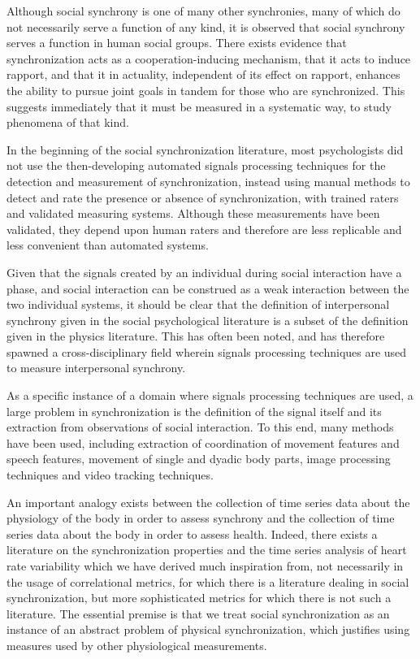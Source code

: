 \documentclass[12pt]{article}
\begin{document}
Although social synchrony is one of many other synchronies, many of which do not necessarily serve a function of any kind, it is observed that social synchrony serves a function in human social groups. There exists evidence that synchronization acts as a cooperation-inducing mechanism\cite{coop}, that it acts to induce rapport\cite{rapport}, and that it in actuality, independent of its effect on rapport, enhances the ability to pursue joint goals in tandem for those who are synchronized\cite{goals}. This suggests immediately that it must be measured in a systematic way, to study phenomena of that kind.

In the beginning of the social synchronization literature, most psychologists did not use the then-developing automated signals processing techniques for the detection and measurement of synchronization, instead using manual methods to detect and rate the presence or absence of synchronization, with trained raters and validated measuring systems\cite{manual}. Although these measurements have been validated\cite{manualval}, they depend upon human raters and therefore are less replicable and less convenient than automated systems.

Given that the signals created by an individual during social interaction have a phase, and social interaction can be construed as a weak interaction between the two individual systems, it should be clear that the definition of interpersonal synchrony given in the social psychological literature is a subset of the definition given in the physics literature. This has often been noted\cite{socialsync}, and has therefore spawned a cross-disciplinary field wherein signals processing techniques are used to measure interpersonal synchrony.

As a specific instance of a domain where signals processing techniques are used, a large problem in synchronization is the definition of the signal itself and its extraction from observations of social interaction. To this end, many methods have been used, including extraction of coordination of movement features and speech features\cite{movementfeatures}, movement of single and dyadic body parts\cite{movementparts}, image processing techniques\cite{imageprocessing} and video tracking techniques\cite{videotracking}.

An important analogy exists between the collection of time series data about the physiology of the body in order to assess synchrony and the collection of time series data about the body in order to assess health. Indeed, there exists a literature on the synchronization properties and the time series analysis of heart rate variability which we have derived much inspiration from, not necessarily in the usage of correlational metrics, for which there is a literature dealing in social synchronization, but more sophisticated metrics for which there is not such a literature\cite{hrv1}. The essential premise is that we treat social synchronization as an instance of an abstract problem of physical synchronization, which justifies using measures used by other physiological measurements.
\end{document}
